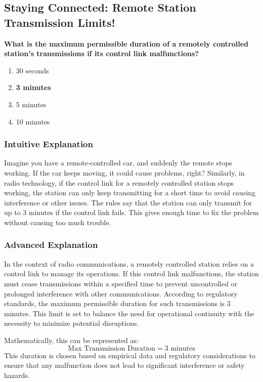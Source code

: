 \subsection{Staying Connected: Remote Station Transmission Limits!}
\label{sec:E1C08}

\begin{tcolorbox}[colback=gray!10!white,colframe=black!75!black,title={\textbf{E1C08}}]
\textbf{What is the maximum permissible duration of a remotely controlled station’s transmissions if its control link malfunctions?}
\begin{enumerate}[label=\Alph*)]
    \item 30 seconds
    \item \textbf{3 minutes}
    \item 5 minutes
    \item 10 minutes
\end{enumerate}
\end{tcolorbox}

\subsubsection{Intuitive Explanation}
Imagine you have a remote-controlled car, and suddenly the remote stops working. If the car keeps moving, it could cause problems, right? Similarly, in radio technology, if the control link for a remotely controlled station stops working, the station can only keep transmitting for a short time to avoid causing interference or other issues. The rules say that the station can only transmit for up to 3 minutes if the control link fails. This gives enough time to fix the problem without causing too much trouble.

\subsubsection{Advanced Explanation}
In the context of radio communications, a remotely controlled station relies on a control link to manage its operations. If this control link malfunctions, the station must cease transmissions within a specified time to prevent uncontrolled or prolonged interference with other communications. According to regulatory standards, the maximum permissible duration for such transmissions is 3 minutes. This limit is set to balance the need for operational continuity with the necessity to minimize potential disruptions.

Mathematically, this can be represented as:
\[
\text{Max Transmission Duration} = 3 \text{ minutes}
\]
This duration is chosen based on empirical data and regulatory considerations to ensure that any malfunction does not lead to significant interference or safety hazards.

